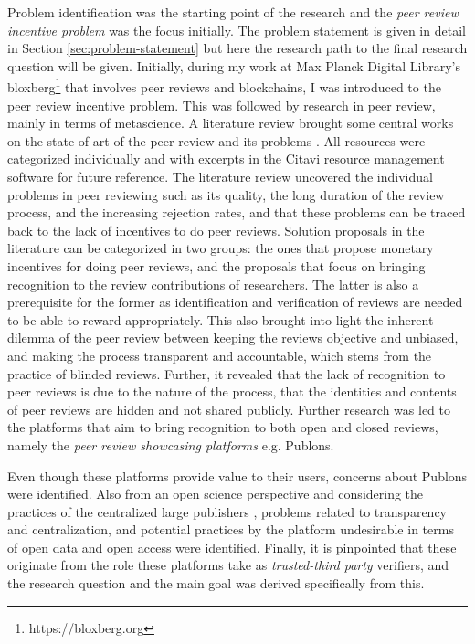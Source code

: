 Problem identification was the starting point of the research and the \textit{peer review incentive problem} was the focus initially. The problem statement is given in detail in Section \ref{sec:problem-statement} but here the research path to the final research question will be given. Initially, during my work at Max Planck Digital Library's bloxberg\footnote{https://bloxberg.org} that involves peer reviews and blockchains, I was introduced to the peer review incentive problem. This was followed by research in peer review, mainly in terms of metascience. A literature review brought some central works on the state of art of the peer review and its problems \parencite{Bornmann.2011, Ferreira.2016, HorbachS.P.J.M..2018, Tennant.2018, Tennant.2017, Tennant.2017, Publons.2018, Kovanis.2016, Moxham.2018, RossHellauer.2017b, RossHellauer.2017, Ware.2008}. All resources were categorized individually and with excerpts in the Citavi resource management software for future reference. The literature review uncovered the individual problems in peer reviewing such as its quality, the long duration of the review process, and the increasing rejection rates, and that these problems can be traced back to the lack of incentives to do peer reviews. Solution proposals in the literature can be categorized in two groups: the ones that propose monetary incentives for doing peer reviews, and the proposals that focus on bringing recognition to the review contributions of researchers. The latter is also a prerequisite for the former as identification and verification of reviews are needed to be able to reward appropriately. This also brought into light the inherent dilemma of the peer review between keeping the reviews objective and unbiased, and making the process transparent and accountable, which stems from the practice of blinded reviews. Further, it revealed that the lack of recognition to peer reviews is due to the nature of the process, that the identities and contents of peer reviews are hidden and not shared publicly. Further research was led to the platforms that aim to bring recognition to both open and closed reviews, namely the \textit{peer review showcasing platforms} e.g. Publons. 

Even though these platforms provide value to their users, concerns about Publons were identified. Also from an open science perspective and considering the practices of the centralized large publishers \parencite{Lariviere.2015}, problems related to transparency and centralization, and potential practices by the platform undesirable in terms of open data and open access were identified. Finally, it is pinpointed that these originate from the role these platforms take as \textit{trusted-third party} verifiers, and the research question and the main goal was derived specifically from this. 


